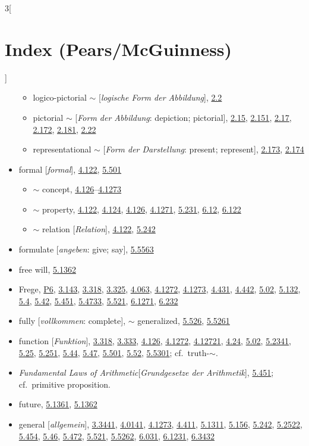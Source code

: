 \documentclass[oneside,openany,12pt]{book}
\newcommand{\indexentry}[1]{\item #1}
\newcommand{\indexsubentry}[1]{\begin{itemize} \item #1 \end{itemize}}
\newcommand{\indexref}[1]{\hyperlink{prop#1}{#1}}
\newcommand{\indexgap}{\bigskip}
\begin{document}
\begin{multicols}{3}[\section*{Index (Pears/McGuinness)}]
\begin{itemize}
   \indexsubentry{logico-pictorial $\sim$ [\textit{logische Form der Abbildung}], \indexref{2.2}}

   \indexsubentry{pictorial $\sim$ [\textit{Form der Abbildung}: depiction; pictorial], \indexref{2.15}, \indexref{2.151}, \indexref{2.17}, \indexref{2.172}, \indexref{2.181}, \indexref{2.22}}

   \indexsubentry{representational $\sim$ [\textit{Form der Darstellung}: present; represent], \indexref{2.173}, \indexref{2.174}}

\indexentry{formal [\textit{formal}], \indexref{4.122}, \indexref{5.501}}

   \indexsubentry{$\sim$ concept, \indexref{4.126}--\indexref{4.1273}}

   \indexsubentry{$\sim$ property, \indexref{4.122}, \indexref{4.124}, \indexref{4.126}, \indexref{4.1271}, \indexref{5.231}, \indexref{6.12}, \indexref{6.122}}

   \indexsubentry{$\sim$ relation [\textit{Relation}], \indexref{4.122}, \indexref{5.242}}

\indexentry{formulate [\textit{angeben}: give; say], \indexref{5.5563}}

\indexentry{free will, \indexref{5.1362}}

\indexentry{Frege, \hyperlink{pref6}{P6}, \indexref{3.143}, \indexref{3.318}, \indexref{3.325}, \indexref{4.063}, \indexref{4.1272}, \indexref{4.1273}, \indexref{4.431}, \indexref{4.442}, \indexref{5.02}, \indexref{5.132}, \indexref{5.4}, \indexref{5.42}, \indexref{5.451}, \indexref{5.4733}, \indexref{5.521}, \indexref{6.1271}, \indexref{6.232}}

\indexentry{fully [\textit{vollkommen}: complete], $\sim$ generalized, \indexref{5.526}, \indexref{5.5261}}

\indexentry{function [\textit{Funktion}], \indexref{3.318}, \indexref{3.333}, \indexref{4.126}, \indexref{4.1272}, \indexref{4.12721}, \indexref{4.24}, \indexref{5.02}, \indexref{5.2341}, \indexref{5.25}, \indexref{5.251}, \indexref{5.44}, \indexref{5.47}, \indexref{5.501}, \indexref{5.52}, \indexref{5.5301}; cf.\ truth-$\sim$.}

\indexentry{\textit{Fundamental Laws of Arithmetic}[\textit{Grundgesetze der Arithmetik}], \indexref{5.451}; cf.\ primitive proposition.}

\indexentry{future, \indexref{5.1361}, \indexref{5.1362}}

\indexgap

\indexentry{general [\textit{allgemein}], \indexref{3.3441}, \indexref{4.0141}, \indexref{4.1273}, \indexref{4.411}, \indexref{5.1311}, \indexref{5.156}, \indexref{5.242}, \indexref{5.2522}, \indexref{5.454}, \indexref{5.46}, \indexref{5.472}, \indexref{5.521}, \indexref{5.5262}, \indexref{6.031}, \indexref{6.1231}, \indexref{6.3432}}


\end{itemize}
\end{multicols}
\end{document}
